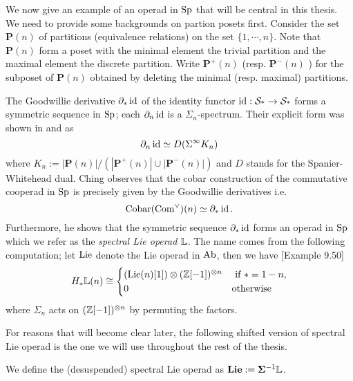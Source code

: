 We now give an example of an operad in $\operatorname{Sp}$ that will be central in this thesis. 
We need to provide some backgrounds on partion posets first. 
Consider the set $\mathbf{P}(n)$ of partitions (equivalence relations) on the set $\{1, \cdots, n \}$. Note that $\mathbf{P}(n)$ form a poset with the minimal element the trivial partition and the maximal element the discrete partition.
Write $\mathbf{P}^{+}(n)$ (resp. $\mathbf{P}^{-}(n)$ ) for the subposet of $\mathbf{P}(n)$ obtained by deleting the minimal (resp. maximal) partitions.
\begin{example}
	The Goodwillie derivative $\partial_* \operatorname{id}$ of the identity functor $\operatorname{id}: \operatorname{\mathcal{S}_{*}} \to \operatorname{\mathcal{S}_{*}}$ forms a symmetric sequence in $\operatorname{Sp}$; each $\partial_n \operatorname{id}$ is a $\Sigma_n$-spectrum. Their explicit form was shown in \cite{JohnsonDerivative} and \cite{Arone-Mahowald} as
	$$
	\partial_n \operatorname{id} \simeq D(\Sigma^{\infty} K_n)
	$$
	where 
	$
	K_{n}:=|\mathbf{P}(n)| /\left(\left|\mathbf{P}^{+}(n)\right| \cup\left|\mathbf{P}^{-}(n)\right|\right)
	$
	and $D$ stands for the Spanier-Whitehead dual. 
	Ching \cite{ChingBar} observes that the cobar construction of the commutative cooperad in $\operatorname{Sp}$ is precisely given by the Goodwillie derivatives  i.e. 
	$$
	\operatorname{Cobar}(\operatorname{Com}^{\vee})(n)\simeq \partial_* \operatorname{id}.
	$$
	Furthermore, he shows that the symmetric sequence $\partial_* \operatorname{id}$ forms an operad in $\operatorname{Sp}$ which we refer as the \emph{spectral Lie operad} ${\mathbb{L}}$. 
	The name comes from the following computation; let $\operatorname{Lie}$ denote the Lie operad in $\operatorname{Ab}$, then we have \cite{ChingBar}[Example 9.50]
	$$
	H_{*}{\mathbb{L}}(n) \cong 	
	\begin{cases}
	(\operatorname{Lie}(n)[1])\otimes ({\mathbb{Z}}[-1])^{\otimes n}& \text{ if $*=1-n$},\\
	0 & \text{otherwise}
	\end{cases}
	$$	
	where $\Sigma_n$ acts on $({\mathbb{Z}}[-1])^{\otimes n}$ by permuting the factors. 
\end{example}

For reasons that will become clear later, the following shifted version of spectral Lie operad is the one  we will use throughout the rest of the thesis.
\begin{definition}
	\label{desuspended spectral Lie operad}
	We define the (desuspended) spectral Lie operad as $\mathbf{Lie} := \mathbf{\Sigma}^{-1} {\mathbb{L}}$.
\end{definition}

